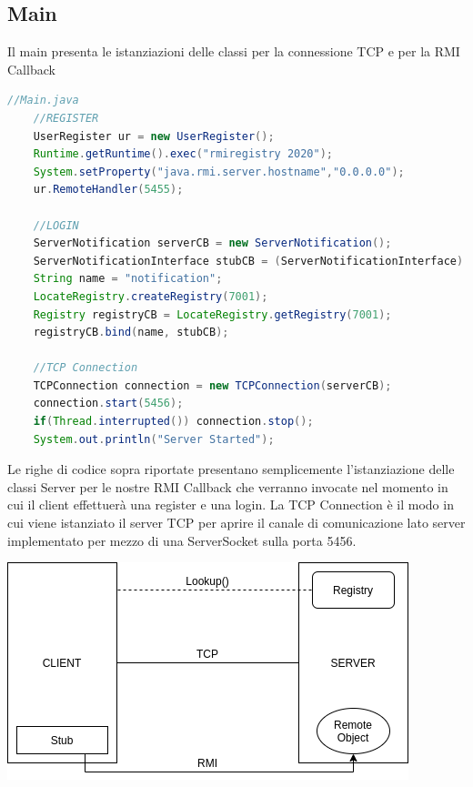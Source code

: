 \documentclass[]{article}
\begin{document}
\subsection{Main}
Il main presenta le istanziazioni delle classi per la connessione TCP e per la RMI Callback
\begin{lstlisting}[language=java]
	//Main.java
	//REGISTER
	UserRegister ur = new UserRegister();
	Runtime.getRuntime().exec("rmiregistry 2020");
	System.setProperty("java.rmi.server.hostname","0.0.0.0");
	ur.RemoteHandler(5455);
	
	//LOGIN
	ServerNotification serverCB = new ServerNotification();
	ServerNotificationInterface stubCB = (ServerNotificationInterface) UnicastRemoteObject.exportObject(serverCB, 0);
	String name = "notification";
	LocateRegistry.createRegistry(7001);
	Registry registryCB = LocateRegistry.getRegistry(7001);
	registryCB.bind(name, stubCB);
	
	//TCP Connection
	TCPConnection connection = new TCPConnection(serverCB);
	connection.start(5456);
	if(Thread.interrupted()) connection.stop();
	System.out.println("Server Started");
\end{lstlisting}
Le righe di codice sopra riportate presentano semplicemente l'istanziazione delle classi Server per le nostre RMI Callback che verranno invocate nel momento in cui il client effettuerà una register e una login. La TCP Connection è il modo in cui viene istanziato il server TCP per aprire il canale di comunicazione lato server implementato per mezzo di una ServerSocket sulla porta 5456.\\
\begin{center}
\includegraphics[scale=0.6]{classDiagram}
\end{center}
\end{document}
